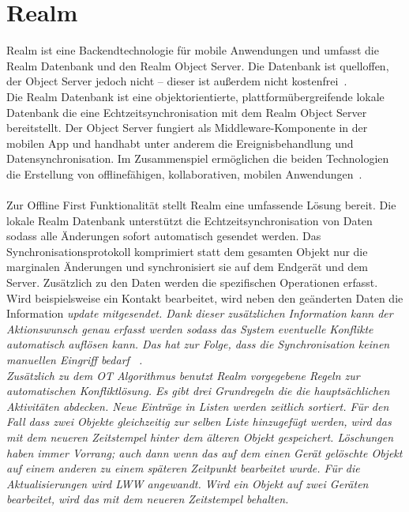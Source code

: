 \section{\label{sub:realm}Realm}
Realm ist eine Backendtechnologie für mobile Anwendungen und umfasst die Realm Datenbank und den Realm Object Server. Die Datenbank ist quelloffen, der Object Server jedoch nicht -- dieser ist außerdem nicht kostenfrei~\cite{realm}.\\
Die Realm Datenbank ist eine objektorientierte, plattformübergreifende lokale Datenbank die eine Echtzeitsynchronisation mit dem Realm Object Server bereitstellt.
Der Object Server fungiert als \gls{Middleware}-Komponente in der mobilen \gls{App} und handhabt unter anderem die Ereignisbehandlung und Datensynchronisation. Im Zusammenspiel ermöglichen die beiden Technologien die Erstellung von offlinefähigen, kollaborativen, mobilen Anwendungen~\cite{realm_whitepaper}.\\\\
Zur Offline First Funktionalität stellt Realm eine umfassende Lösung bereit.
Die lokale Realm Datenbank unterstützt die Echtzeitsynchronisation von Daten sodass alle Änderungen sofort automatisch gesendet werden. Das Synchronisationsprotokoll komprimiert statt dem gesamten Objekt nur die marginalen Änderungen und synchronisiert sie auf dem Endgerät und dem Server. Zusätzlich zu den Daten werden die spezifischen Operationen erfasst. 
Wird beispielsweise ein Kontakt bearbeitet, wird neben den geänderten Daten die Information \it{update} mitgesendet.
Dank dieser zusätzlichen Information kann der Aktionswunsch genau erfasst werden sodass das System eventuelle Konflikte automatisch auflösen kann.
Das hat zur Folge, dass die Synchronisation keinen manuellen Eingriff bedarf ~\cite{realm_offline_whitepaper}.\\
Zusätzlich zu dem \gls{OT} Algorithmus benutzt Realm vorgegebene Regeln zur automatischen Konfliktlösung. Es gibt drei Grundregeln die die hauptsächlichen Aktivitäten abdecken. Neue Einträge in Listen werden zeitlich sortiert. Für den Fall dass zwei Objekte gleichzeitig zur selben Liste hinzugefügt werden, wird das mit dem neueren Zeitstempel hinter dem älteren Objekt gespeichert.
Löschungen haben immer Vorrang; auch dann wenn das auf dem einen Gerät gelöschte Objekt auf einem anderen zu einem späteren Zeitpunkt bearbeitet wurde. Für die Aktualisierungen wird \gls{LWW} angewandt. Wird ein Objekt auf zwei Geräten bearbeitet, wird das mit dem neueren Zeitstempel behalten.\\ 
